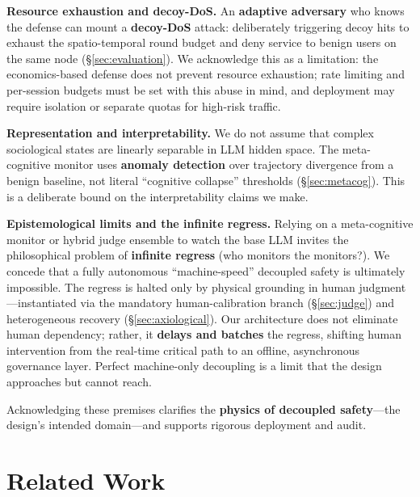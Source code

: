 \documentclass[letterpaper,twocolumn,10pt]{article}
\begin{document}
\textbf{Resource exhaustion and decoy-DoS.} An \textbf{adaptive adversary} who knows the defense can mount a \textbf{decoy-DoS} attack: deliberately triggering decoy hits to exhaust the spatio-temporal round budget and deny service to benign users on the same node (\S\ref{sec:evaluation}). We acknowledge this as a limitation: the economics-based defense does not prevent resource exhaustion; rate limiting and per-session budgets must be set with this abuse in mind, and deployment may require isolation or separate quotas for high-risk traffic.

\textbf{Representation and interpretability.} We do not assume that complex sociological states are linearly separable in LLM hidden space. The meta-cognitive monitor uses \textbf{anomaly detection} over trajectory divergence from a benign baseline, not literal ``cognitive collapse'' thresholds (\S\ref{sec:metacog}). This is a deliberate bound on the interpretability claims we make.

\textbf{Epistemological limits and the infinite regress.} Relying on a meta-cognitive monitor or hybrid judge ensemble to watch the base LLM invites the philosophical problem of \textbf{infinite regress} (who monitors the monitors?). We concede that a fully autonomous ``machine-speed'' decoupled safety is ultimately impossible. The regress is halted only by physical grounding in human judgment---instantiated via the mandatory human-calibration branch (\S\ref{sec:judge}) and heterogeneous recovery (\S\ref{sec:axiological}). Our architecture does not eliminate human dependency; rather, it \textbf{delays and batches} the regress, shifting human intervention from the real-time critical path to an offline, asynchronous governance layer. Perfect machine-only decoupling is a limit that the design approaches but cannot reach.

Acknowledging these premises clarifies the \textbf{physics of decoupled safety}---the design's intended domain---and supports rigorous deployment and audit.

\section{Related Work}
\end{document}
